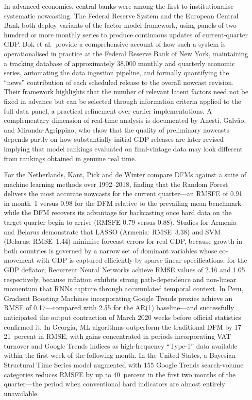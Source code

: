 \documentclass[12pt,a4paper]{report}
\begin{document}
In advanced economies, central banks were among the first to
institutionalise systematic nowcasting. The Federal Reserve System and
the European Central Bank both deploy variants of the factor-model
framework, using panels of two hundred or more monthly series to produce
continuous updates of current-quarter GDP. Bok et al.\ provide a
comprehensive account of how such a system is operationalised in
practice at the Federal Reserve Bank of New York, maintaining a tracking
database of approximately 38{,}000 monthly and quarterly economic
series, automating the data ingestion pipeline, and formally quantifying
the ``news'' contribution of each scheduled release to the overall
nowcast revision.\citep{Bok2017} Their framework highlights that the
number of relevant latent factors need not be fixed in advance but can
be selected through information criteria applied to the full data panel,
a practical refinement over earlier implementations. A complementary
dimension of real-time analysis is documented by Anesti, Galv\~{a}o,
and Miranda-Agrippino, who show that the quality of preliminary nowcasts
depends partly on how substantially initial GDP releases are later
revised---implying that model rankings evaluated on final-vintage data
may look different from rankings obtained in genuine real
time.\citep{Anesti2020}

For the Netherlands, Kant, Pick and de Winter compare DFMs against a
suite of machine learning methods over 1992--2018, finding that the
Random Forest delivers the most accurate nowcasts for the current
quarter---an RMSFE of 0.91 in month~1 versus 0.98 for the DFM relative
to the prevailing mean benchmark---while the DFM recovers its advantage
for backcasting once hard data on the target quarter begin to arrive
(RMSFE 0.79 versus 0.88).\citep{NetherlandsDNB2022} Studies for Armenia
and Belarus demonstrate that LASSO (Armenia: RMSE~3.38) and SVM
(Belarus: RMSE~1.44) minimise forecast errors for real GDP, because
growth in both countries is governed by a narrow set of dominant
variables whose co-movement with GDP is captured efficiently by sparse
linear specifications; for the GDP deflator, Recurrent Neural Networks
achieve RMSE values of 2.16 and 1.05 respectively, because inflation
exhibits strong path-dependence and non-linear momentum that RNNs
capture through accumulated temporal context.\citep{ArmeniaBelarus2024}
In Peru, Gradient Boosting Machines incorporating Google Trends proxies
achieve an RMSE of 0.17---compared with 2.55 for the AR(1)
baseline---and successfully anticipated the output contraction of March
2020 weeks before official statistics confirmed it.\citep{Peru2024} In
Georgia, ML algorithms outperform the traditional DFM by 17--21~percent
in RMSE, with gains concentrated in periods incorporating VAT turnover
and Google Trends indices as high-frequency ``Type-1'' data available
within the first week of the following month.\citep{Georgia2022} In the
United States, a Bayesian Structural Time Series model augmented with
155 Google Trends search-volume categories reduces RMSFE by up to
40~percent in the first two months of the quarter---the period when
conventional hard indicators are almost entirely unavailable.\citep{US2022}
\end{document}
